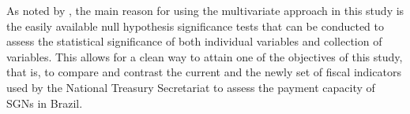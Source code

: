 As noted by \citet{baldacci2011b}, the main reason for using the multivariate approach in this study is the easily available null hypothesis significance tests that can be conducted to assess the statistical significance of both individual variables and collection of variables. This allows for a clean way to attain one of the objectives of this study, that is, to compare and contrast the current and the newly set of fiscal indicators used by the National Treasury Secretariat to assess the payment capacity of SGNs in Brazil.






